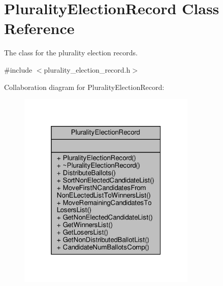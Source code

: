 \hypertarget{classPluralityElectionRecord}{}\section{Plurality\+Election\+Record Class Reference}
\label{classPluralityElectionRecord}


The class for the plurality election records.  




{\ttfamily \#include $<$plurality\+\_\+election\+\_\+record.\+h$>$}



Collaboration diagram for Plurality\+Election\+Record\+:\nopagebreak
\begin{figure}[H]
\begin{center}
\leavevmode
\includegraphics[width=241pt]{classPluralityElectionRecord__coll__graph}
\end{center}
\end{figure}
